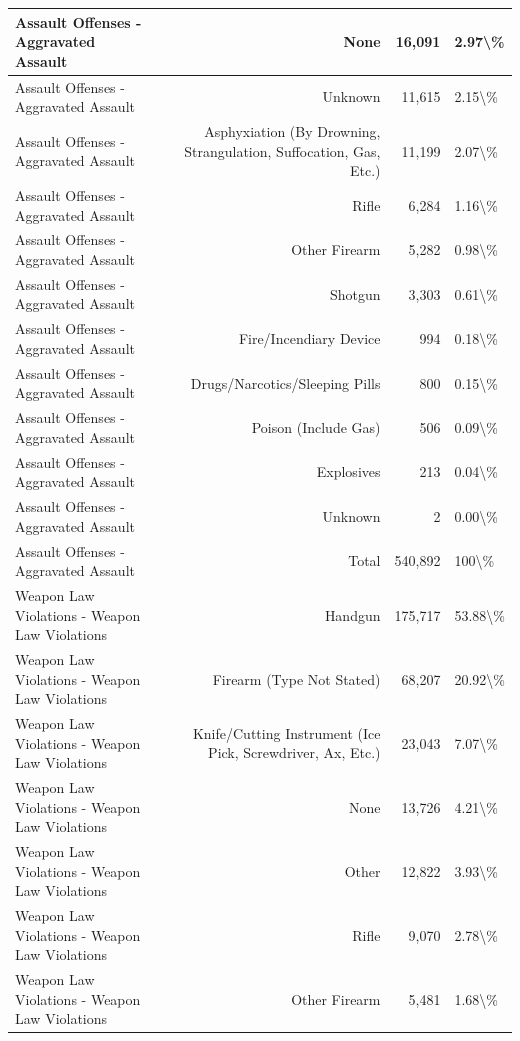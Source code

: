 \documentclass[
]{krantz}
\begin{document}
\begin{longtable}[t]{l|r|r|l}
\hline
Assault Offenses - Aggravated Assault & None & 16,091 & 2.97\textbackslash{}\%\\
\hline
Assault Offenses - Aggravated Assault & Unknown & 11,615 & 2.15\textbackslash{}\%\\
\hline
Assault Offenses - Aggravated Assault & Asphyxiation (By Drowning, Strangulation, Suffocation, Gas, Etc.) & 11,199 & 2.07\textbackslash{}\%\\
\hline
Assault Offenses - Aggravated Assault & Rifle & 6,284 & 1.16\textbackslash{}\%\\
\hline
Assault Offenses - Aggravated Assault & Other Firearm & 5,282 & 0.98\textbackslash{}\%\\
\hline
Assault Offenses - Aggravated Assault & Shotgun & 3,303 & 0.61\textbackslash{}\%\\
\hline
Assault Offenses - Aggravated Assault & Fire/Incendiary Device & 994 & 0.18\textbackslash{}\%\\
\hline
Assault Offenses - Aggravated Assault & Drugs/Narcotics/Sleeping Pills & 800 & 0.15\textbackslash{}\%\\
\hline
Assault Offenses - Aggravated Assault & Poison (Include Gas) & 506 & 0.09\textbackslash{}\%\\
\hline
Assault Offenses - Aggravated Assault & Explosives & 213 & 0.04\textbackslash{}\%\\
\hline
Assault Offenses - Aggravated Assault & Unknown & 2 & 0.00\textbackslash{}\%\\
\hline
Assault Offenses - Aggravated Assault & Total & 540,892 & 100\textbackslash{}\%\\
\hline
Weapon Law Violations - Weapon Law Violations & Handgun & 175,717 & 53.88\textbackslash{}\%\\
\hline
Weapon Law Violations - Weapon Law Violations & Firearm (Type Not Stated) & 68,207 & 20.92\textbackslash{}\%\\
\hline
Weapon Law Violations - Weapon Law Violations & Knife/Cutting Instrument (Ice Pick, Screwdriver, Ax, Etc.) & 23,043 & 7.07\textbackslash{}\%\\
\hline
Weapon Law Violations - Weapon Law Violations & None & 13,726 & 4.21\textbackslash{}\%\\
\hline
Weapon Law Violations - Weapon Law Violations & Other & 12,822 & 3.93\textbackslash{}\%\\
\hline
Weapon Law Violations - Weapon Law Violations & Rifle & 9,070 & 2.78\textbackslash{}\%\\
\hline
Weapon Law Violations - Weapon Law Violations & Other Firearm & 5,481 & 1.68\textbackslash{}\%\\

\end{longtable}
\end{document}
